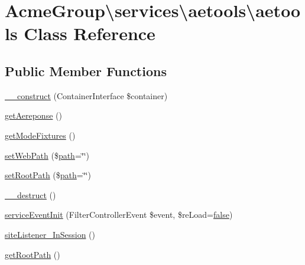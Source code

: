 \hypertarget{class_acme_group_1_1services_1_1aetools_1_1aetools}{\section{Acme\+Group\textbackslash{}services\textbackslash{}aetools\textbackslash{}aetools Class Reference}
\label{class_acme_group_1_1services_1_1aetools_1_1aetools}
}
\subsection*{Public Member Functions}
\begin{DoxyCompactItemize}
\item 
\hyperlink{class_acme_group_1_1services_1_1aetools_1_1aetools_adcbe505617a0475e7f939c50071c05b2}{\+\_\+\+\_\+construct} (Container\+Interface \$container)
\item 
\hyperlink{class_acme_group_1_1services_1_1aetools_1_1aetools_a66b7d64ca7a2a82c19f31284338ef1c9}{get\+Aereponse} ()
\item 
\hyperlink{class_acme_group_1_1services_1_1aetools_1_1aetools_a56b96194e980c26fe57ee0768bb716f0}{get\+Mode\+Fixtures} ()
\item 
\hyperlink{class_acme_group_1_1services_1_1aetools_1_1aetools_aad87531e5f90d44239dc8077f1306690}{set\+Web\+Path} (\$\hyperlink{jquery_8mobile-1_83_81_8js_a85880b4fcfb12e8240a306187313f0b4}{path}=\char`\"{}\char`\"{})
\item 
\hyperlink{class_acme_group_1_1services_1_1aetools_1_1aetools_a861c5b1cf0581a772580cd75a6887a5f}{set\+Root\+Path} (\$\hyperlink{jquery_8mobile-1_83_81_8js_a85880b4fcfb12e8240a306187313f0b4}{path}=\char`\"{}\char`\"{})
\item 
\hyperlink{class_acme_group_1_1services_1_1aetools_1_1aetools_ab4ab5512a2060ea8345c2413df63c74d}{\+\_\+\+\_\+destruct} ()
\item 
\hyperlink{class_acme_group_1_1services_1_1aetools_1_1aetools_a2d40f052bc6b2655a09086a1a372c6d8}{service\+Event\+Init} (Filter\+Controller\+Event \$event, \$re\+Load=\hyperlink{validate_8js_a5df37b7f02e5cdc7d9412b7f872b8e01}{false})
\item 
\hyperlink{class_acme_group_1_1services_1_1aetools_1_1aetools_a3e511e6428c843f7ad8f9083d0218809}{site\+Listener\+\_\+\+In\+Session} ()
\item 
\hyperlink{class_acme_group_1_1services_1_1aetools_1_1aetools_ab53f8533b71f3dcf3d355ea6cd1374f2}{get\+Root\+Path} ()

\end{DoxyCompactItemize}
